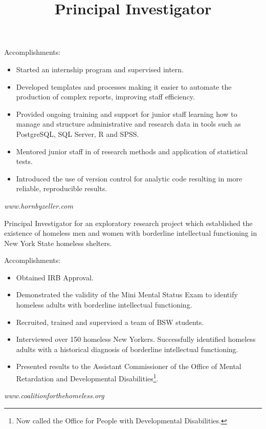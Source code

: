 \documentclass[line, margin, 10pt]{res}
\begin{document}
\begin{resume}
\begin{position}
    Accomplishments:
    \begin{itemize}
    \item Started an internship program and supervised intern.
    \item Developed templates and processes making it easier to
      automate the production of complex reports, improving staff
      efficiency.
    \item Provided ongoing training and support for junior staff
      learning how to manage and structure administrative and research
      data in tools such as PostgreSQL, SQL Server, R and SPSS.
    \item Mentored junior staff in of research methods and application
      of statistical tests.
    \item Introduced the use of version control for analytic code
      resulting in more reliable, reproducible results.
    \end{itemize}
    \emph{www.hornbyzeller.com}
  \end{position}

  \title{Principal Investigator}
  \begin{position}
    Principal Investigator for an exploratory research project which
    established the existence of homeless men and women with
    borderline intellectual functioning in New York State homeless
    shelters.

    Accomplishments:
    \begin{itemize}
    \item Obtained IRB Approval.
    \item Demonstrated the validity of the Mini Mental Status Exam to
      identify homeless adults with borderline intellectual functioning.
    \item Recruited, trained and supervised a team of BSW students.
    \item Interviewed over 150 homeless New Yorkers. Successfully
      identified homeless adults with a historical diagnosis of
      borderline intellectual functioning.
    \item Presented results to the Assistant Commissioner
      of the Office of Mental Retardation and Developmental
      Disabilities\footnote{Now called the Office for People with
        Developmental Disabilities.}.
    \end{itemize}
    \emph{www.coalitionforthehomeless.org}
  \end{position}



\end{resume}
\end{document}
